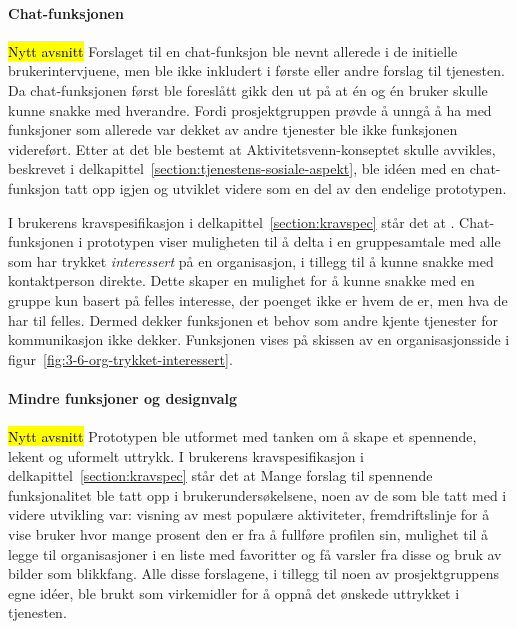 \paragraph{Chat-funksjonen}
\hl{Nytt avsnitt}
Forslaget til en chat-funksjon ble nevnt allerede i de initielle brukerintervjuene, men ble ikke inkludert i første eller andre forslag til tjenesten. Da chat-funksjonen først ble foreslått gikk den ut på at én og én bruker skulle kunne snakke med hverandre. Fordi prosjektgruppen prøvde å unngå å ha med funksjoner som allerede var dekket av andre tjenester ble ikke funksjonen videreført. Etter at det ble bestemt at Aktivitetsvenn-konseptet skulle avvikles, beskrevet i delkapittel~\ref{section:tjenestens-sosiale-aspekt}, ble idéen med en chat-funksjon tatt opp igjen og utviklet videre som en del av den endelige prototypen. 

I brukerens kravspesifikasjon i delkapittel~\ref{section:kravspec} står det at . Chat-funksjonen i prototypen viser muligheten til å delta i en gruppesamtale med alle som har trykket {\em interessert} på en organisasjon, i tillegg til å kunne snakke med kontaktperson direkte. Dette skaper en mulighet for å kunne snakke med en gruppe kun basert på felles interesse, der poenget ikke er hvem de er, men hva de har til felles. Dermed dekker funksjonen et behov som andre kjente tjenester for kommunikasjon ikke dekker. Funksjonen vises på skissen av en organisasjonsside i figur~\ref{fig:3-6-org-trykket-interessert}.

\paragraph{Mindre funksjoner og designvalg}
\hl{Nytt avsnitt}
Prototypen ble utformet med tanken om å skape et spennende, lekent og uformelt uttrykk. I brukerens kravspesifikasjon i delkapittel~\ref{section:kravspec} står det at  Mange forslag til spennende funksjonalitet ble tatt opp i brukerundersøkelsene, noen av de som ble tatt med i videre utvikling var: visning av mest populære aktiviteter, fremdriftslinje for å vise bruker hvor mange prosent den er fra å fullføre profilen sin, mulighet til å legge til organisasjoner i en liste med favoritter og få varsler fra disse og bruk av bilder som blikkfang. Alle disse forslagene, i tillegg til noen av prosjektgruppens egne idéer, ble brukt som virkemidler for å oppnå det ønskede uttrykket i tjenesten.

